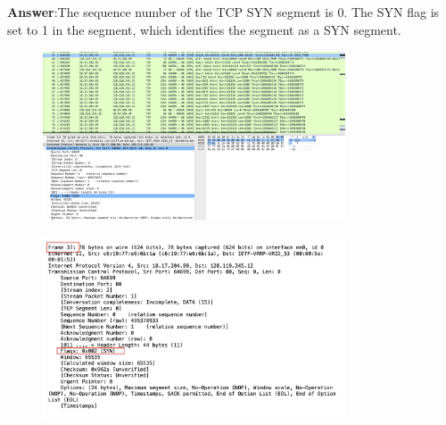 \documentclass{article}
\begin{document}
\begin{CJK*}{UTF8}{gbsn}
\subsection{}
\textbf{Answer}:The sequence number of the TCP SYN segment is 0.
The SYN flag is set to 1 in the segment, which identifies the segment as a SYN segment.
\begin{figure}[H]
    \centering
    \includegraphics[width=0.8\textwidth]{4-1.png}
\end{figure}
\begin{figure}[H]
    \centering
    \includegraphics[width=0.8\textwidth]{4-2.png}
\end{figure}


\end{CJK*}
\end{document}
